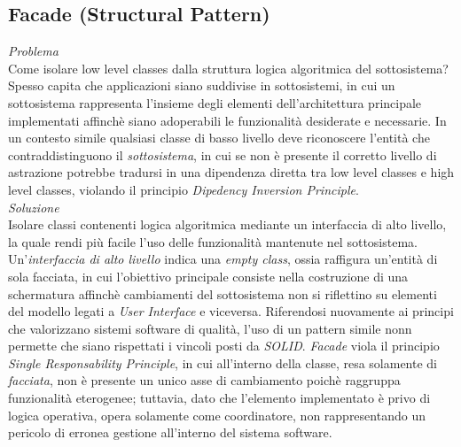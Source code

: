 \documentclass{article}
\begin{document}
\subsection*{Facade (Structural Pattern)}
\large
\textit{Problema}\\
Come isolare low level classes dalla struttura logica algoritmica del sottosistema?\vspace*{14pt}\\
Spesso capita che applicazioni siano suddivise in sottosistemi, in cui un sottosistema rappresenta l'insieme degli elementi dell'architettura principale implementati affinchè siano adoperabili le funzionalità desiderate e necessarie. In un contesto simile qualsiasi classe di basso livello deve riconoscere l'entità che contraddistinguono il \textit{sottosistema}, in cui se non è presente il corretto livello di astrazione potrebbe tradursi in una dipendenza diretta tra low level classes e high level classes, violando il principio \textit{Dipedency Inversion Principle}.\vspace*{14pt}\\
\textit{Soluzione}\\
Isolare classi contenenti logica algoritmica mediante un interfaccia di alto livello, la quale rendi più facile l'uso delle funzionalità mantenute nel sottosistema.\vspace*{14pt}\\
Un'\textit{interfaccia di alto livello} indica una \textit{empty class}, ossia raffigura un'entità di sola facciata, in cui l'obiettivo principale consiste nella costruzione di una schermatura affinchè cambiamenti del sottosistema non si riflettino su elementi del modello legati a \textit{User Interface} e viceversa. Riferendosi nuovamente ai principi che valorizzano sistemi software di qualità, l'uso di un pattern simile nonn permette che siano rispettati i vincoli posti da \textit{SOLID}. \textit{Facade} viola il principio \textit{Single Responsability Principle}, in cui all'interno della classe, resa solamente di \textit{facciata}, non è presente un unico asse di cambiamento poichè raggruppa funzionalità eterogenee; tuttavia, dato che l'elemento implementato è privo di logica operativa, opera solamente come coordinatore, non rappresentando un pericolo di erronea gestione all'interno del sistema software. 
\end{document}
